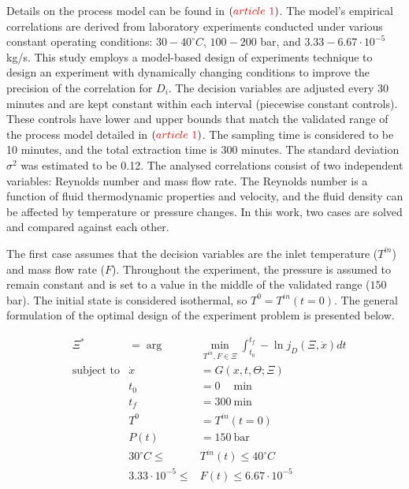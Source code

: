 \documentclass[../Article_Design_of_Experiment.tex]{subfiles}
\begin{document}
	Details on the process model can be found in $({\color{red}article~1})$. The model's empirical correlations are derived from laboratory experiments conducted under various constant operating conditions: $30 - 40^\circ C$, $100 - 200$ bar, and $3.33-6.67 \cdot 10^{-5}$ kg/s. This study employs a model-based design of experiments technique to design an experiment with dynamically changing conditions to improve the precision of the correlation for $D_i$. The decision variables are adjusted every 30 minutes and are kept constant within each interval (piecewise constant controls). These controls have lower and upper bounds that match the validated range of the process model detailed in $({\color{red}article~1})$. The sampling time is considered to be 10 minutes, and the total extraction time is 300 minutes. The standard deviation $\sigma^2$ was estimated to be 0.12. The analysed correlations consist of two independent variables: Reynolds number and mass flow rate. The Reynolds number is a function of fluid thermodynamic properties and velocity, and the fluid density can be affected by temperature or pressure changes. In this work, two cases are solved and compared against each other. 
	
	The first case assumes that the decision variables are the inlet temperature ($T^{in}$) and mass flow rate ($F$). Throughout the experiment, the pressure is assumed to remain constant and is set to a value in the middle of the validated range ($150$ bar). The initial state is considered isothermal, so $T^0=T^{in}(t=0)$. The general formulation of the optimal design of the experiment problem is presented below.
	
	{\footnotesize
	\begin{equation}
		\begin{aligned} 
			&\Xi^* &= \arg &\min_{ T^{in}, F \in \Xi} \int_{t_0}^{t_f} - \ln j_D(\Xi,\dot{x}) dt  \\
			&\text{subject to}
			& \dot{x} &= G(x,t,\Theta;\Xi) \\
			&& t_0&=0\quad~\text{min} \\
			&& t_f&=300~\text{min} \\
			&& T^{0} &= T^{in}(t=0) \\
			&& P(t) &= 150~\text{bar} \\
			&& 30^\circ C \leq &T^{in}(t) \leq 40^\circ C \\
			&& 3.33 \cdot 10^{-5} \leq &F(t) \leq 6.67 \cdot 10^{-5}
		\end{aligned} \label{EQ:Formulation_1}
	\end{equation} } 
\end{document}
